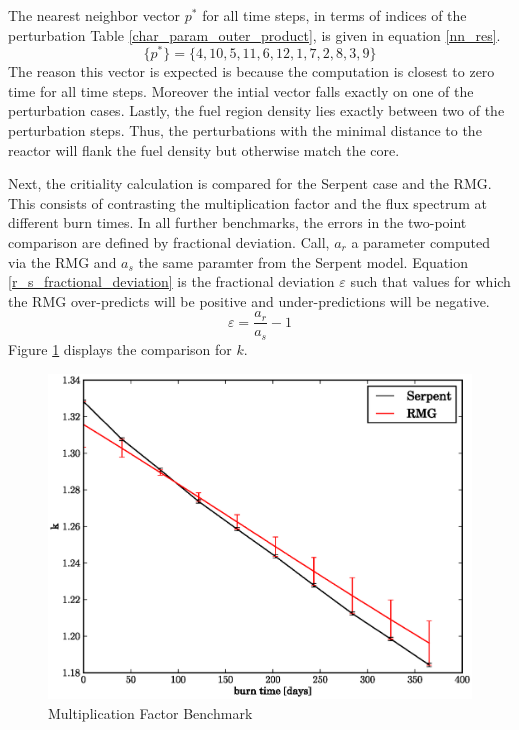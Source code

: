 The nearest neighbor vector $p^*$ for all time steps, in terms of indices
of the perturbation Table \ref{char_param_outer_product}, is given in equation \ref{nn_res}.
\begin{equation}
\label{nn_res}
\{p^*\} = \{4, 10,  5, 11,  6, 12,  1,  7,  2,  8,  3,  9\}
\end{equation}
The reason this vector is expected is because the computation is closest to zero time for all 
time steps.  Moreover the intial  vector falls exactly on one of the perturbation cases.
Lastly, the fuel region density lies exactly between two of the perturbation steps.  Thus, the 
perturbations with the minimal distance to the reactor will flank the fuel density but otherwise 
match the core.

Next, the critiality calculation is compared for the Serpent case and the RMG.  This consists of 
contrasting the multiplication factor and the flux spectrum at different burn times.  In all further
benchmarks, the errors in the two-point comparison are defined by fractional deviation.  Call, $a_r$ 
a parameter computed via the RMG and $a_s$ the same paramter from the Serpent model.  Equation 
\ref{r_s_fractional_deviation} is the fractional deviation $\varepsilon$ such that values for which the RMG
over-predicts will be positive and under-predictions will be negative.
\begin{equation}
\label{r_s_fractional_deviation}
\varepsilon = \frac{a_r}{a_s} - 1
\end{equation}
Figure \ref{k_compare} displays the comparison for $k$.  
\begin{figure}[htbp]
\caption{Multiplication Factor Benchmark}
\label{k_compare}
\begin{center}
\includegraphics[scale=0.5]{multigroup_method/figs/benchmark/k.eps}
\end{center}
\end{figure}
